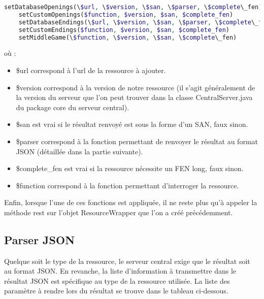 \documentclass[a4paper,11pt]{article}
\begin{document}
\lstset{xleftmargin =-2.2cm}
\begin{lstlisting}[language=php]
	setDatabaseOpenings(\$url, \$version, \$san, \$parser, \$complete\_fen)
	setCustomOpenings($function, $version, $san, $complete_fen)
	setDatabaseEndings(\$url, \$version, \$san, \$parser, \$complete\_fen)
	setCustomEndings($function, $version, $san, $complete_fen)
	setMiddleGame(\$function, \$version, \$san, \$complete\_fen)
\end{lstlisting}
	
où :

\begin{itemize}
	\item \$url correspond à l'url de la ressource à ajouter.
	\item \$version correspond à la version de notre ressource (il s'agit généralement de la version du serveur que l'on peut trouver dans la classe CentralServer.java du package core du serveur central).
	\item \$san est vrai si le résultat renvoyé est sous la forme d'un SAN, faux sinon.
	\item \$parser correspond à la fonction permettant de renvoyer le résultat au format JSON (détaillée dans la partie suivante).
	\item \$complete\_fen est vrai si la ressource nécessite un FEN long, faux sinon.
	\item \$function correspond à la fonction permettant d'interroger la ressource. 
\end{itemize}
Enfin, lorsque l'une de ces fonctions est appliquée, il ne reste plus qu'à appeler la méthode rest sur l'objet ResourceWrapper que l'on a créé précédemment.
	
\subsection{Parser JSON}
Quelque soit le type de la ressource, le serveur central exige que le résultat soit au format JSON. En revanche, la liste d'information à transmettre dans le résultat JSON est spécifique au type de la ressource utilisée. La liste des paramètre à rendre lors du résultat se trouve dans le tableau ci-dessous.
\end{document}
